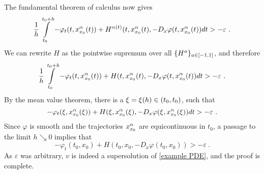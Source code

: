 \begin{example}
\begin{equation*}
	\end{equation*}
	The fundamental theorem of calculus now gives
	\begin{equation*}
		\frac{1}{h} \int\limits_{t_0}^{t_0 + h} -\varphi_t(t, x_{x_0}^{\alpha}(t)) + H^{\alpha(t)}(t, x_{x_0}^{\alpha}(t), -D_x \varphi(t, x_{x_0}^{\alpha}(t)) dt > - \varepsilon \ .
	\end{equation*}
	We can rewrite $ H $ as the pointwise supremum over all $ \{H^{a}\}_{a \in \left[ -1, 1 \right]} $, and therefore
	\begin{equation*}
		\frac{1}{h} \int\limits_{t_0}^{t_0 + h} -\varphi_t(t, x_{x_0}^{\alpha}(t)) + H(t, x_{x_0}^{\alpha}(t), -D_x \varphi(t, x_{x_0}^{\alpha}(t)) dt > - \varepsilon \ .
	\end{equation*}
	By the mean value theorem, there is a $ \xi = \xi(h) \in \left(t_0, t_0\right) $, such that
	\begin{equation*}
		-\varphi_t(\xi, x_{x_0}^{\alpha}(\xi)) + H(\xi, x_{x_0}^{\alpha}(\xi), -D_x \varphi(\xi, x_{x_0}^{\alpha}(\xi)) dt > - \varepsilon \ .
	\end{equation*}
	Since $ \varphi $ is smooth and the trajectories $ x_{x_0}^{\alpha} $ are equicontinuous in $ t_0 $, a passage to the limit $ h \searrow 0 $ implies that
	\begin{equation*}
		- \varphi_t (t_0, x_0) + H(t_0, x_0, - D_x \varphi(t_0, x_0)) > - \varepsilon \ .
	\end{equation*}
	As $ \varepsilon $ was arbitrary, $ v $ is indeed a supersolution of \eqref{example PDE}, and the proof is complete.
\end{example}